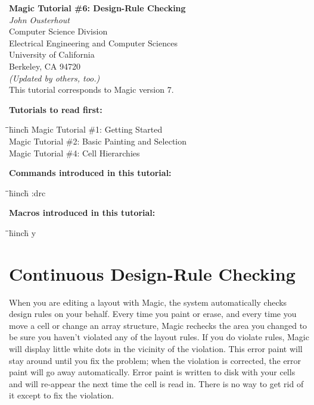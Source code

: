 \documentclass[letterpaper,twoside,12pt]{article}
\def\hinch{\hspace*{0.5in}}
\def\starti{\begin{center}\begin{tabbing}\hinch\=\hinch\=\hinch\=hinch\hinch\=\kill}
\def\endi{\end{tabbing}\end{center}}
\def\mytitle{Magic Tutorial \#6: Design-Rule Checking}
\begin{document}
\makeatletter
\newcommand{\ps@magic}{%
	\renewcommand{\@oddhead}{\mytitle\hfil\today}%
	\renewcommand{\@evenhead}{\today\hfil\mytitle}%
	\renewcommand{\@evenfoot}{\hfil\textrm{--{\thepage}--}\hfil}%
	\renewcommand{\@oddfoot}{\@evenfoot}}
\newcommand{\ps@mplain}{%
	\renewcommand{\@oddhead}{}%
	\renewcommand{\@evenhead}{}%
	\renewcommand{\@evenfoot}{\hfil\textrm{--{\thepage}--}\hfil}%
	\renewcommand{\@oddfoot}{\@evenfoot}}
\makeatother
\pagestyle{magic}
\thispagestyle{mplain}


\begin{center}
  {\bfseries \Large \mytitle} \\
  \vspace*{0.5in}
  {\itshape John Ousterhout} \\
  \vspace*{0.5in}
   Computer Science Division \\
   Electrical Engineering and Computer Sciences \\
   University of California \\
   Berkeley, CA  94720 \\
  \vspace*{0.25in}
  {\itshape (Updated by others, too.)} \\
  \vspace*{0.25in}
  This tutorial corresponds to Magic version 7. \\
\end{center}
\vspace*{0.5in}

{\noindent\bfseries\large Tutorials to read first:}
\starti
   \> Magic Tutorial \#1: Getting Started \\
   \> Magic Tutorial \#2: Basic Painting and Selection \\
   \> Magic Tutorial \#4: Cell Hierarchies
\endi

{\noindent\bfseries\large Commands introduced in this tutorial:}
\starti
   \> :drc
\endi

{\noindent\bfseries\large Macros introduced in this tutorial:}

\starti
   \> y
\endi

\vspace*{0.75in}
\section{Continuous Design-Rule Checking}

When you are editing a layout with Magic, the system automatically
checks design rules on your behalf.  Every time you paint or
erase, and every time you move a cell or change an array structure,
Magic rechecks the area you changed to be sure you haven't
violated any of the layout rules.  If you do violate rules,
Magic will display little white dots in the vicinity of the
violation.  This error paint will stay around until you
fix the problem;  when the violation is corrected, the error paint
will go away automatically.  Error paint is written to disk
with your cells and will re-appear the next time the cell is
read in.  There is no way to get rid of it except to fix the
violation.
\end{document}
